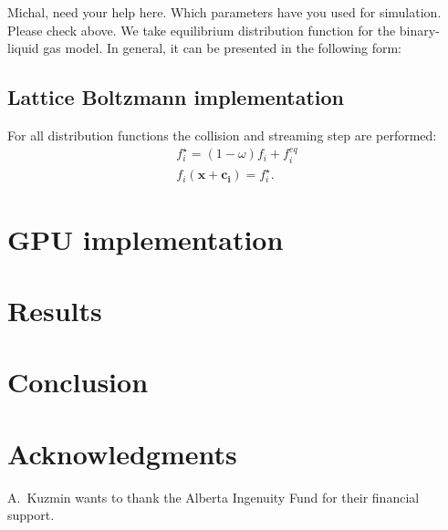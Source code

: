 \documentclass[mathpazo,sort,numbers]{cicp}
\begin{document}
{\color{red} Michal, need your help here. Which parameters have you used for simulation. Please check above.}
We take equilibrium distribution function for the binary-liquid gas model. In general, it can be presented in the following form:
\subsection{Lattice Boltzmann implementation}
For all distribution functions the collision and streaming step are performed:
\begin{equation*}
\begin{aligned}
f_i^{\star}=(1-\omega)f_i+f_i^{eq}\\
f_i(\bm{x}+\bm{c_i})=f_i^{\star}. 
\end{aligned}
\end{equation*}

\section{GPU implementation}
\section{Results}
\section{Conclusion}
\section*{Acknowledgments}
A.~Kuzmin wants to thank the Alberta Ingenuity Fund for their financial support.




\end{document}
